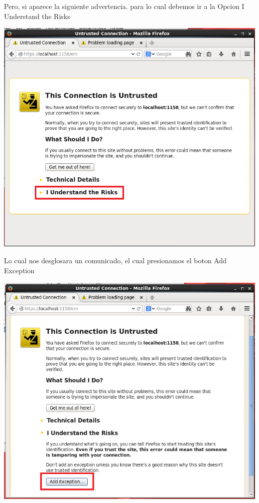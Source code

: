 Pero, si aparece la siguiente advertencia. para lo cual debemos ir a la Opcion I Understand the Risks
\begin{center}
	\includegraphics[width=15cm]{./Imagenes/88} 
\end{center}

Lo cual nos desglosara un comunicado, el cual presionamos el boton Add Exception
\begin{center}
	\includegraphics[width=15cm]{./Imagenes/89} 
\end{center}

